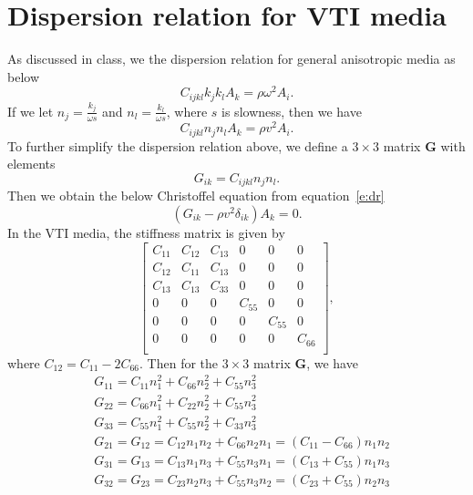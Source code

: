 \documentclass[referee]{../../../texCls/mayWithTeaser}
\begin{document}
\section{Dispersion relation for VTI media}
As discussed in class, we the dispersion relation for general anisotropic media
as below
\begin{equation}
  C_{ijkl}k_jk_lA_k=\rho\omega^2A_i.
\end{equation}
If we let $n_j=\frac{k_j}{\omega s}$ and $n_l=\frac{k_l}{\omega s}$, where $s$
is slowness, then we have
\begin{equation}
  C_{ijkl}n_jn_lA_k=\rho v^2A_i.
  \label{e:dr}
\end{equation}
To further simplify the dispersion relation above, we define a $3\times 3$ matrix 
$\mathbf{G}$ with elements 
\begin{equation}
G_{ik}=C_{ijkl}n_jn_l.
\end{equation}
Then we obtain the below Christoffel equation from equation~\ref{e:dr}
\begin{equation}
  (G_{ik}-\rho v^2\delta_{ik})A_k=0.
\end{equation}
In the VTI media, the stiffness matrix is given by
\begin{equation}
  \left[\begin{matrix}
     C_{11} & C_{12} & C_{13} & 0 & 0 & 0\\
     C_{12} & C_{11} & C_{13} & 0 & 0 & 0\\
     C_{13} & C_{13} & C_{33} & 0 & 0 & 0\\
     0 & 0 & 0 & C_{55} & 0 & 0\\
     0 & 0 & 0 & 0 & C_{55} & 0\\
     0 & 0 & 0 & 0 & 0 & C_{66}\\
  \end{matrix}\right],
\end{equation}
where $C_{12}=C_{11}-2C_{66}$.
Then for the $3\times 3$ matrix $\mathbf{G}$, we have
\begin{equation}
  \begin{split}
    &G_{11}= C_{11}n^2_1+C_{66}n^2_2+C_{55}n^2_3\\
    &G_{22}= C_{66}n^2_1+C_{22}n^2_2+C_{55}n^2_3\\
    &G_{33}= C_{55}n^2_1+C_{55}n^2_2+C_{33}n^2_3\\
    &G_{21}=G_{12}= C_{12}n_1n_2+C_{66}n_2n_1=(C_{11}-C_{66})n_1n_2\\
    &G_{31}=G_{13}= C_{13}n_1n_3+C_{55}n_3n_1=(C_{13}+C_{55})n_1n_3\\
    &G_{32}=G_{23}= C_{23}n_2n_3+C_{55}n_3n_2=(C_{23}+C_{55})n_2n_3\\
  \end{split}
\end{equation}
\end{document}
